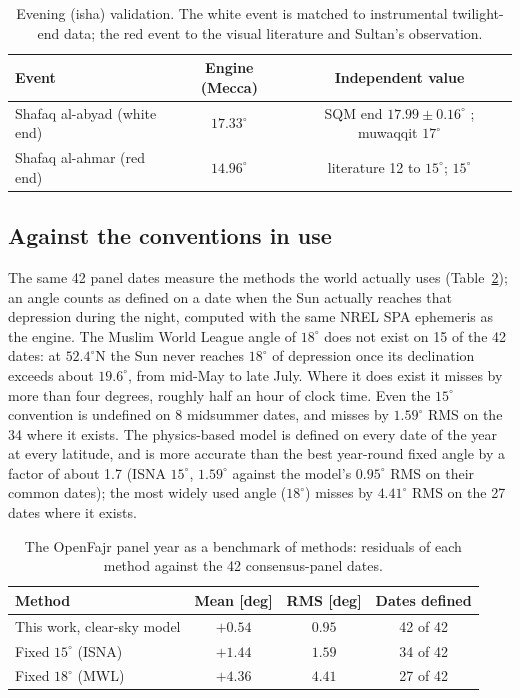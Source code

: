 \documentclass[preprint,12pt]{elsarticle}
\begin{document}
\begin{table}[t]
\centering
\caption{Evening (isha) validation. The white event is matched to
instrumental twilight-end data; the red event to the visual
literature and Sultan's observation.}
\label{tab:isha}
\footnotesize
\setlength{\tabcolsep}{4pt}
\begin{tabular}{lcc}
\toprule
Event & Engine (Mecca) & Independent value \\
\midrule
Shafaq al-abyad (white end) & $17.33^{\circ}$ & SQM end $17.99 \pm 0.16^{\circ}$ \citep{niri2012}; muwaqqit $17^{\circ}$ \\
Shafaq al-ahmar (red end) & $14.96^{\circ}$ & literature 12 to $15^{\circ}$; \citet{sultan2004} $15^{\circ}$ \\
\bottomrule
\end{tabular}
\end{table}

\subsection{Against the conventions in use}

The same 42 panel dates measure the methods the world actually uses
(Table~\ref{tab:conventions}); an angle counts as defined on a date
when the Sun actually reaches that depression during the night,
computed with the same NREL SPA ephemeris as the engine. The Muslim
World League angle of $18^{\circ}$ does not exist on 15 of the 42
dates: at $52.4^{\circ}$N the Sun never reaches $18^{\circ}$ of
depression once its declination exceeds about $19.6^{\circ}$, from
mid-May to late July. Where it does exist it misses by more than four
degrees, roughly half an hour of clock time. Even the $15^{\circ}$
convention is undefined on 8 midsummer dates, and misses by
$1.59^{\circ}$ RMS on the 34 where it exists. The physics-based model
is defined on every date of the year at every latitude, and is more
accurate than the best year-round fixed angle by a factor of about 1.7
(ISNA $15^{\circ}$, $1.59^{\circ}$ against the model's $0.95^{\circ}$
RMS on their common dates); the most widely used angle ($18^{\circ}$)
misses by $4.41^{\circ}$ RMS on the 27 dates where it exists.

\begin{table}[t]
\centering
\caption{The OpenFajr panel year as a benchmark of methods: residuals
of each method against the 42 consensus-panel dates.}
\label{tab:conventions}
\small
\begin{tabular}{lccc}
\toprule
Method & Mean [deg] & RMS [deg] & Dates defined \\
\midrule
This work, clear-sky model & $+0.54$ & $0.95$ & 42 of 42 \\
Fixed $15^{\circ}$ (ISNA) & $+1.44$ & $1.59$ & 34 of 42 \\
Fixed $18^{\circ}$ (MWL) & $+4.36$ & $4.41$ & 27 of 42 \\
\bottomrule
\end{tabular}
\end{table}
\end{document}
